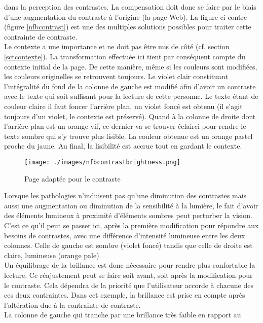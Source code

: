 \documentclass[french,a4paper]{report}
\begin{document}
{dans la perception des contrastes. La compensation doit donc se faire par le
biais d'une augmentation du contraste à l'origine (la page Web). La figure
ci-contre (figure \ref{nfbcontrast}) est une des multiples
solutions possibles pour traiter cette contrainte de contraste.\\
Le contexte a une importance et ne doit pas être mis de côté (cf. section
\ref{sctcontexte}). La transformation effectuée ici tient par conséquent compte
du contexte initial de la page. De cette manière, même si les couleurs sont
modifiées, les couleurs originelles se retrouvent toujours. Le violet clair
constituant l'intégralité du fond de la colonne de gauche est modifié afin
d'avoir un contraste avec le texte qui soit suffisant pour la lecture de cette
personne. Le texte étant de couleur claire il faut foncer l'arrière plan, un
violet foncé est obtenu (il s'agit toujours d'un violet, le contexte est
préservé). Quand à la colonne de droite dont l'arrière plan est un orange vif,
ce dernier va se trouver éclairci pour rendre le texte sombre qui s'y trouve
plus lisible. La couleur obtenue est un orange pastel proche du jaune. Au final,
la lisibilité est accrue tout en gardant le contexte. \newline
\begin{wrapfigure}{r}{7.6cm}\centering
\texttt{[image: ./images/nfbcontrastbrightness.png]}
\vspace{-0.6cm}
\caption{Page adaptée pour le contraste}
\label{nfbcontrastbrightness}
\end{wrapfigure}
Lorsque les pathologies n'induisent pas qu'une diminution des contrastes mais
aussi une augmentation ou diminution de la sensibilité à la lumière, le fait
d'avoir des éléments lumineux à proximité d'éléments sombres peut perturber la
vision. C'est ce qu'il peut se passer ici, après la première modification pour
répondre aux besoins de contrastes, avec une différence d'intensité lumineuse
entre les deux colonnes. Celle de gauche est sombre (violet foncé) tandis que
celle de droite est claire, lumineuse (orange pale).\\
Un équilibrage de la brillance est donc nécessaire pour rendre plus confortable
la lecture. Ce réajustement peut se faire soit avant, soit après la modification
pour le contraste. Cela dépendra de la priorité que l'utilisateur accorde à
chacune des ces deux contraintes. Dans cet exemple,
la brillance est prise en compte après l'altération due à la contrainte de contraste.\\
La colonne de gauche qui tranche par une brillance très faible en rapport au
}
\end{document}

